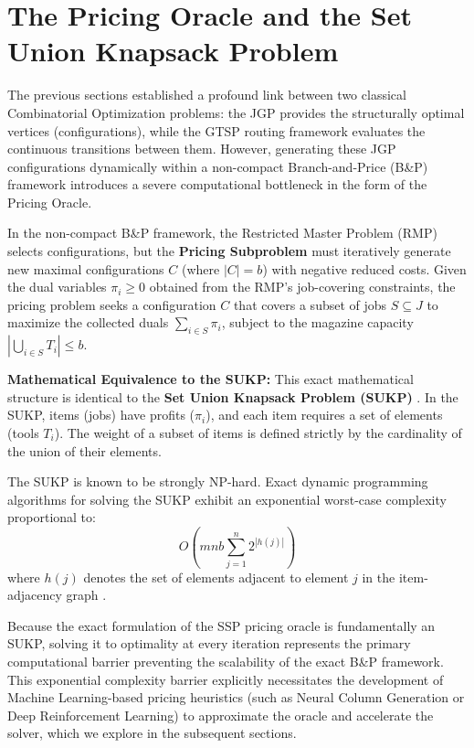 \documentclass[12pt]{article}
\begin{document}
\section{The Pricing Oracle and the Set Union Knapsack Problem}

The previous sections established a profound link between two classical Combinatorial Optimization problems: the JGP provides the structurally optimal vertices (configurations), while the GTSP routing framework evaluates the continuous transitions between them. However, generating these JGP configurations dynamically within a non-compact Branch-and-Price (B\&P) framework introduces a severe computational bottleneck in the form of the Pricing Oracle. 

In the non-compact B\&P framework, the Restricted Master Problem (RMP) selects configurations, but the \textbf{Pricing Subproblem} must iteratively generate new maximal configurations $C$ (where $|C| = b$) with negative reduced costs. Given the dual variables $\pi_i \ge 0$ obtained from the RMP's job-covering constraints, the pricing problem seeks a configuration $C$ that covers a subset of jobs $S \subseteq J$ to maximize the collected duals $\sum_{i \in S} \pi_i$, subject to the magazine capacity $|\bigcup_{i \in S} T_i| \le b$. 

\textbf{Mathematical Equivalence to the SUKP:}
This exact mathematical structure is identical to the \textbf{Set Union Knapsack Problem (SUKP)} \cite{Goldschmidt1994}. In the SUKP, items (jobs) have profits ($\pi_i$), and each item requires a set of elements (tools $T_i$). The weight of a subset of items is defined strictly by the cardinality of the union of their elements. 

The SUKP is known to be strongly NP-hard. Exact dynamic programming algorithms for solving the SUKP exhibit an exponential worst-case complexity proportional to:
\begin{equation}
	O\left(m n b \sum_{j=1}^n 2^{|h(j)|}\right)
\end{equation}
where $h(j)$ denotes the set of elements adjacent to element $j$ in the item-adjacency graph \cite{Goldschmidt1994}. 

Because the exact formulation of the SSP pricing oracle is fundamentally an SUKP, solving it to optimality at every iteration represents the primary computational barrier preventing the scalability of the exact B\&P framework. This exponential complexity barrier explicitly necessitates the development of Machine Learning-based pricing heuristics (such as Neural Column Generation or Deep Reinforcement Learning) to approximate the oracle and accelerate the solver, which we explore in the subsequent sections.
\end{document}
